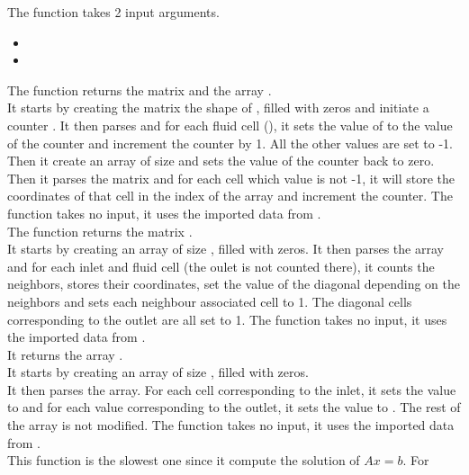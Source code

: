 \smallbreak{}
The function  takes 2 input arguments.
\begin{itemize}
      \item {}
      \item {} 
\end{itemize}
The function returns the matrix  and the array .\\
It starts by creating the matrix  the shape of , filled with zeros
and initiate a counter . It then parses  and for each fluid
cell (), it sets the value of  to the value of the
counter and increment the counter by 1. All the other values are set to -1.\\
Then it create an array  of size  and
sets the value of the counter back to zero. Then it parses the matrix 
and for each cell which value is not -1, it will store the coordinates of that
cell in the index  of the array  and increment the
counter.
\smallbreak{}
The function  takes no input, it uses the imported data from
.\\
The function returns the matrix .\\
It starts by creating an array  of size
, filled with zeros. It then
parses the array  and for each inlet and fluid cell (the oulet
is not counted there), it counts the neighbors, stores their coordinates,
set the value of the diagonal depending on the neighbors and sets each
neighbour associated cell to 1. The diagonal cells corresponding to the outlet
are all set to 1.
\smallbreak{}
The function  takes no input, it uses the imported data from
.\\
It returns the array .\\
It starts by creating an array  of size
, filled with zeros.\\
It then parses the array. For each cell corresponding to the inlet, it sets the
value to  and for each value corresponding to the outlet, it sets
the value to . The rest of the array is not modified.
\smallbreak{}
The function  takes no input, it uses the imported data from
.\\
This function is the slowest one since it compute the solution of $Ax = b$. For
